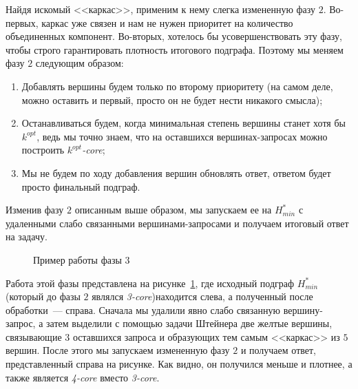 \documentclass[11pt,a4paper,oneside]{article}
\begin{document}
Найдя искомый <<каркас>>, применим к нему слегка измененную фазу $2$. Во-первых, каркас уже связен и нам не нужен приоритет на количество объединенных компонент. Во-вторых, хотелось бы усовершенствовать эту фазу, чтобы строго гарантировать плотность итогового подграфа. Поэтому мы меняем фазу $2$ следующим образом:

\begin{enumerate}
  \item Добавлять вершины будем только по второму приоритету (на самом деле, можно оставить и первый, просто он не будет нести никакого смысла);
  \item Останавливаться будем, когда минимальная степень вершины станет хотя бы $k^{opt}$, ведь мы точно знаем, что на оставшихся вершинах-запросах можно построить \textit{$k^{opt}$-core};
  \item Мы не будем по ходу добавления вершин обновлять ответ, ответом будет просто финальный подграф.
\end{enumerate}

Изменив фазу $2$ описанным выше образом, мы запускаем ее на $H_{min}^*$ с удаленными слабо связанными вершинами-запросами и получаем итоговый ответ на задачу.

\begin{figure}[!h]
\caption{Пример работы фазы $3$}\label{phase3-example}
\centering
  \begin{center}
  \end{center}
\end{figure}

Работа этой фазы представлена на рисунке~\ref{phase3-example}, где исходный подграф $H_{min}^*$ (который до фазы $2$ являлся \textit{3-core})находится слева, а полученный после обработки~--- справа. Сначала мы удалили явно слабо связанную вершину-запрос, а затем выделили с помощью задачи Штейнера две желтые вершины, связывающие $3$ оставшихся запроса и образующих тем самым <<каркас>> из $5$ вершин. После этого мы запускаем измененную фазу $2$ и получаем ответ, представленный справа на рисунке. Как видно, он получился меньше и плотнее, а также является \textit{4-core} вместо \textit{3-core}.
\end{document}
